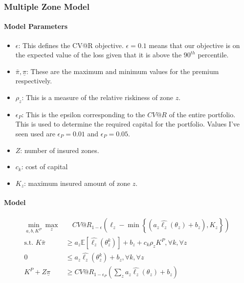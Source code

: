 \documentclass[11pt]{article}
\begin{document}
    \subsubsection*{Multiple Zone Model}
    \paragraph*{Model Parameters}
        \begin{itemize}
            \item $\epsilon$: This defines the CV@R objective. $\epsilon = 0.1$ means that our objective is on the expected value of the loss given that it is above the $90^{th}$ percentile. 
            \item $\bar{\pi}, \underline{\pi}$: These are the maximum and minimum values for the premium respectively. 
            \item $\rho_z$: This is a measure of the relative riskiness of zone $z$. 
            \item $\epsilon_P$: This is the epsilon corresponding to the $CV@R$ of the entire portfolio. This is used to determine the required capital for the portfolio. Values I've seen used are $\epsilon_P=0.01$ and $\epsilon_P=0.05$. 
            \item $Z$: number of insured zones.
            \item $c_k$: cost of capital
            \item $K_z$: maximum insured amount of zone $z$.  
        \end{itemize}

        \paragraph*{Model}
        
        \begin{align}
            \min_{a,b,K^P} \max_z &\quad CV@R_{1-\epsilon}(\ell_z - \min\left\{(a_z\hat{\ell_z}(\theta_z) + b_z), K_z\right\})\\
            \text{s.t.   } K\bar{\pi} &\geq a_z \mathbb{E}[\hat{\ell_z}(\theta^k_z)] + b_z + c_k\rho_z K^P,  \forall k, \forall z\\
            0 &\leq a_z\hat{\ell_z}(\theta^k_z) + b_z, \forall k, \forall z \\
            K^P + Z\underline{\pi} &\geq CV@R_{1-\epsilon_P}\left( \sum_z a_z \hat{\ell_z}(\theta_z) + b_z \right)
        \end{align}
        
\end{document}

